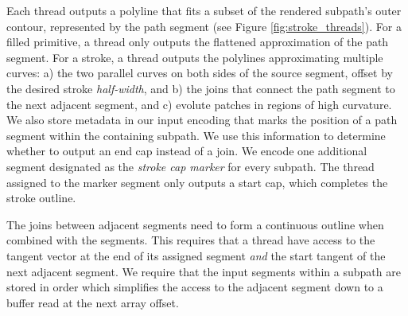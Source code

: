 \documentclass[sigconf, nonacm]{acmart}
\begin{document}
Each thread outputs a polyline that fits a subset of the rendered subpath's outer contour, represented by the path segment (see Figure \ref{fig:stroke_threads}). For a filled primitive, a thread only outputs the flattened approximation of the path segment. For a stroke, a thread outputs the polylines approximating multiple curves: a) the two parallel curves on both sides of the source segment, offset by the desired stroke \emph{half-width}, and b) the joins that connect the path segment to the next adjacent segment, and c) evolute patches in regions of high curvature. We also store metadata in our input encoding that marks the position of a path segment within the containing subpath. We use this information to determine whether to output an end cap instead of a join. We encode one additional segment designated as the \emph{stroke cap marker} for every subpath. The thread assigned to the marker segment only outputs a start cap, which completes the stroke outline.

The joins between adjacent segments need to form a continuous outline when combined with the segments. This requires that a thread have access to the tangent vector at the end of its assigned segment \emph{and} the start tangent of the next adjacent segment. We require that the input segments within a subpath are stored in order which simplifies the access to the adjacent segment down to a buffer read at the next array offset.

\newcommand{\nosemic}{\SetEndCharOfAlgoLine{\relax}}%
\newcommand{\dosemic}{\SetEndCharOfAlgoLine{\string;}}%
\newcommand{\pushline}{\Indp}%
\newcommand{\popline}{\Indm\dosemic}%
\end{document}
